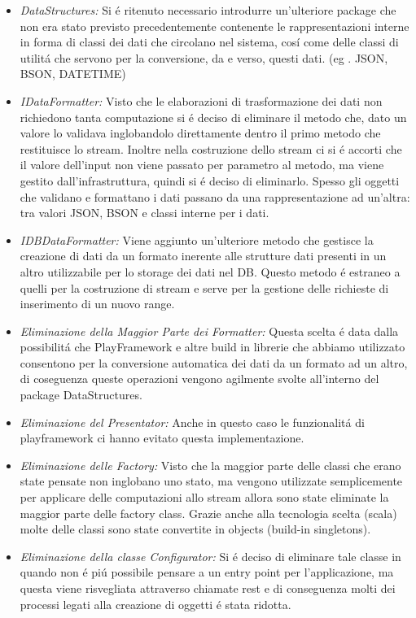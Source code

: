 \begin{itemize}
  \item \textit{DataStructures:} Si \'e ritenuto necessario introdurre un'ulteriore package che non era stato previsto precedentemente contenente le rappresentazioni interne in forma di classi dei dati che circolano nel sistema, cos\'i come delle classi di utilit\'a che servono per la conversione, da e verso, questi dati. (eg . JSON, BSON, DATETIME)
  \item \textit{IDataFormatter:} Visto che le elaborazioni di trasformazione dei dati non richiedono tanta computazione si \'e deciso di eliminare il metodo che, dato un valore lo validava inglobandolo direttamente dentro il primo metodo che restituisce lo stream. Inoltre nella costruzione dello stream ci si \'e accorti che il valore dell'input non viene passato per parametro al metodo, ma viene gestito dall'infrastruttura, quindi si \'e deciso di eliminarlo. Spesso gli oggetti che validano e formattano i dati passano da una rappresentazione ad un'altra: tra valori JSON, BSON e classi interne per i dati.
  \item \textit{IDBDataFormatter:} Viene aggiunto un'ulteriore metodo che gestisce la creazione di dati da un formato inerente alle strutture dati presenti in un altro utilizzabile per lo storage dei dati nel DB. Questo metodo \'e estraneo a quelli per la costruzione di stream e serve per la gestione delle richieste di inserimento di un nuovo range.
  \item \textit{Eliminazione della Maggior Parte dei Formatter:} Questa scelta \'e data dalla possibilit\'a che PlayFramework e altre build in librerie che abbiamo utilizzato consentono per la conversione automatica dei dati da un formato ad un altro, di coseguenza queste operazioni vengono agilmente svolte all'interno del package DataStructures.
  \item \textit{Eliminazione del Presentator:} Anche in questo caso le funzionalit\'a di playframework ci hanno evitato questa implementazione.
  \item \textit{Eliminazione delle Factory:} Visto che la maggior parte delle classi che erano state pensate non inglobano uno stato, ma vengono utilizzate semplicemente per applicare delle computazioni allo stream allora sono state eliminate la maggior parte delle factory class. Grazie anche alla tecnologia scelta (scala) molte delle classi sono state convertite in objects (build-in singletons).
  \item \textit{Eliminazione della classe Configurator:} Si \'e deciso di eliminare tale classe in quando non \'e pi\'u possibile pensare a un entry point per l'applicazione, ma questa viene risvegliata attraverso chiamate rest e di conseguenza molti dei processi legati alla creazione di oggetti \'e stata ridotta.

\end{itemize}
